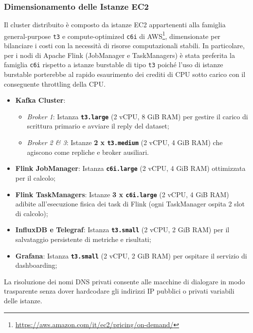 \documentclass[conference]{IEEEtran}
\begin{document}
\subsubsection{Dimensionamento delle Istanze EC2}\label{subsubsec:ec2_instances}
Il cluster distribuito è composto da istanze EC2 appartenenti alla famiglia general-purpose \texttt{t3} e compute-optimized \texttt{c6i} di AWS\footnote{\url{https://aws.amazon.com/it/ec2/pricing/on-demand/}}, dimensionate per bilanciare i costi con la necessità di risorse computazionali stabili. In particolare, per i nodi di Apache Flink (JobManager e TaskManagers) è stata preferita la famiglia \texttt{c6i} rispetto a istanze burstable di tipo \texttt{t3} poiché l'uso di istanze burstable porterebbe al rapido esaurimento dei crediti di CPU sotto carico con il conseguente throttling della CPU.
\begin{itemize}
    \item \textbf{Kafka Cluster}:
    \begin{itemize}
        \item \emph{Broker 1}: Istanza \textbf{\texttt{t3.large}} (2 vCPU, 8 GiB RAM) per gestire il carico di scrittura primario e avviare il reply del dataset;
        \item \emph{Broker 2 \& 3}: Istanze \textbf{2 x \texttt{t3.medium}} (2 vCPU, 4 GiB RAM) che agiscono come repliche e broker ausiliari.
    \end{itemize}
    \item \textbf{Flink JobManager}: Istanza \textbf{\texttt{c6i.large}} (2 vCPU, 4 GiB RAM) ottimizzata per il calcolo;
    \item \textbf{Flink TaskManagers}: Istanze \textbf{3 x \texttt{c6i.large}} (2 vCPU, 4 GiB RAM) adibite all'esecuzione fisica dei task di Flink (ogni TaskManager ospita 2 slot di calcolo);
    \item \textbf{InfluxDB e Telegraf}: Istanza \textbf{\texttt{t3.small}} (2 vCPU, 2 GiB RAM) per il salvataggio persistente di metriche e risultati;
    \item \textbf{Grafana}: Istanza \textbf{\texttt{t3.small}} (2 vCPU, 2 GiB RAM) per ospitare il servizio di dashboarding;
\end{itemize}

La risoluzione dei nomi DNS privati consente alle macchine di dialogare in modo trasparente senza dover hardcodare gli indirizzi IP pubblici o privati variabili delle istanze.

\end{document}
